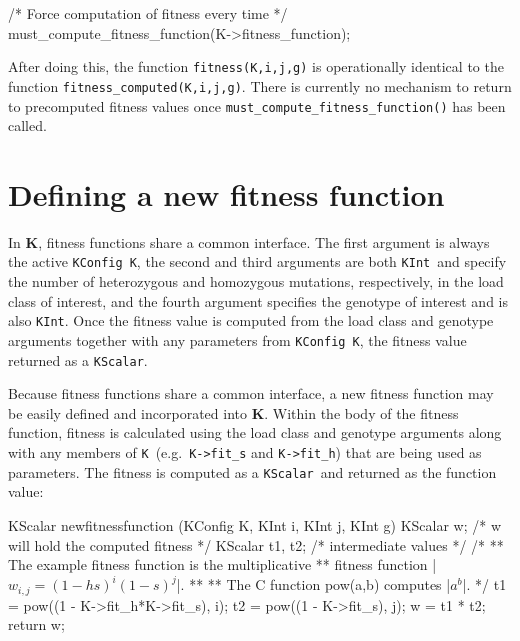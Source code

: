 \documentclass[12pt,twoside,letterpaper,fleqn]{report}
\numberwithin{equation}{section}  %
\newcommand{\K}{{\bf K}}
\newcommand{\KK}{\mbox{{\tt K}}}  %
\newcommand{\KScalar}{\mbox{\tt KScalar}}
\newcommand{\KInt}{\mbox{\tt KInt}}
\newcommand{\KConfig}{\mbox{\tt KConfig}}
\begin{document}
{\begin{C}[gobble=4]
    /* Force computation of fitness every time */
    must_compute_fitness_function(K->fitness_function);
\end{C}

After doing this, the function \lstinline{fitness(K,i,j,g)} is operationally
identical to the function \lstinline{fitness_computed(K,i,j,g)}.  There is
currently no mechanism to return to precomputed fitness values once
\lstinline{must_compute_fitness_function()} has been called.

\section{Defining a new fitness function\label{section:definingfitnessfunction}}

In \K, fitness functions share a common interface.  The first argument is
always the active \KConfig\ \KK, the second and third arguments are both \KInt\
and specify the number of heterozygous and homozygous mutations, respectively,
in the load class of interest, and the fourth argument specifies the genotype
of interest and is also \KInt.  Once the fitness value is computed from the
load class and genotype arguments together with any parameters from \KConfig\
\KK, the fitness value returned as a \KScalar.

Because fitness functions share a common interface, a new fitness function may
be easily defined and incorporated into \K.  Within the body of the fitness
function, fitness is calculated using the load class and genotype arguments
along with any members of \KK\ (e.g.\ \lstinline{K->fit_s} and
\lstinline{K->fit_h}) that are being used as parameters.  The fitness is
computed as a \KScalar\ and returned as the function value:

\begin{C}[gobble=4,mathescape=true,escapechar=|]
    KScalar  newfitnessfunction  (KConfig K, KInt i, KInt j, KInt g)
    {
        KScalar w;       /* w will hold the computed fitness */
        KScalar t1, t2;  /* intermediate values */
        /*
        ** The example fitness function is the multiplicative
        ** fitness function |$w_{i,j}=(1-hs)^{i}(1-s)^{j}$|.
        **
        ** The C function pow(a,b) computes |$a^b$|.
        */
        t1 = pow((1 - K->fit_h*K->fit_s), i);
        t2 = pow((1 - K->fit_s), j);
        w = t1 * t2;
        return w;
    }
\end{C}

}
\end{document}
